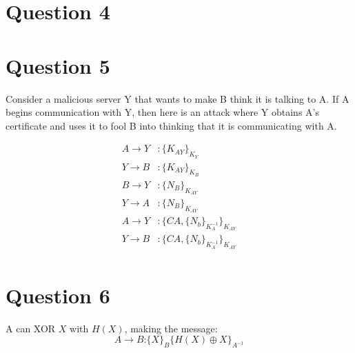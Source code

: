 \documentclass[a4paper]{article}
\begin{document}
\section{Question 4}

\section{Question 5}
Consider a malicious server Y that wants to make B think it is talking to A. If A
begins communication with Y, then here is an attack where Y obtains A's certificate and
uses it to fool B into thinking that it is communicating with A.

\begin{align*}
	A \longrightarrow Y &: \{K_{AY}\}_{K_{Y}}\\
	Y \longrightarrow B &: \{K_{AY}\}_{K_{B}}\\
	B \longrightarrow Y &: \{N_B\}_{K_{AY}}\\
	Y \longrightarrow A &: \{N_B\}_{K_{AY}}\\
	A \longrightarrow Y &: \{CA,\{N_b\}_{K_A^{-1}} \}_{K_{AY}}\\
	Y \longrightarrow B &: \{CA,\{N_b\}_{K_A^{-1}} \}_{K_{AY}}\\
\end{align*}

\section{Question 6}
A can XOR $X$ with $H(X)$, making the message:
$$
A \longrightarrow B \text{:} \{X\}_B \{ H(X) \oplus X \}_{A^{-1}}
$$

\end{document}
